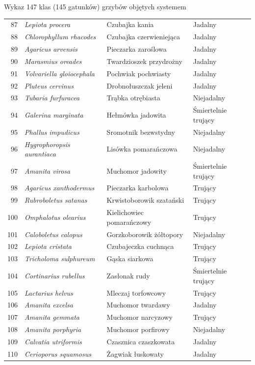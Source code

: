 \begin{easyappendix}{Wykaz 147 klas (145 gatunków) grzybów objętych systemem}
\begin{longtable}{|r|l|l|l|}
87 & \textit{Lepiota procera} & Czubajka kania & Jadalny \\
88 & \textit{Chlorophyllum rhacodes} & Czubajka czerwieniejąca & Jadalny \\
89 & \textit{Agaricus arvensis} & Pieczarka zaroślowa & Jadalny \\
90 & \textit{Marasmius oreades} & Twardzioszek przydrożny & Jadalny \\
91 & \textit{Volvariella gloiocephala} & Pochwiak pochwiasty & Jadalny \\
92 & \textit{Pluteus cervinus} & Drobnołuszczak jeleni & Jadalny \\
93 & \textit{Tubaria furfuracea} & Trąbka otrębiasta & Niejadalny \\
94 & \textit{Galerina marginata} & Hełmówka jadowita & Śmiertelnie trujący \\
95 & \textit{Phallus impudicus} & Sromotnik bezwstydny & Niejadalny \\
96 & \textit{Hygrophoropsis aurantiaca} & Lisówka pomarańczowa & Niejadalny \\
97 & \textit{Amanita virosa} & Muchomor jadowity & Śmiertelnie trujący \\
98 & \textit{Agaricus xanthodermus} & Pieczarka karbolowa & Trujący \\
99 & \textit{Rubroboletus satanas} & Krwistoborowik szatański & Trujący \\
100 & \textit{Omphalotus olearius} & Kielichowiec pomarańczowy & Trujący \\
101 & \textit{Caloboletus calopus} & Gorzkoborowik żółtopory & Niejadalny \\
102 & \textit{Lepiota cristata} & Czubajeczka cuchnąca & Trujący \\
103 & \textit{Tricholoma sulphureum} & Gąska siarkowa & Trujący \\
104 & \textit{Cortinarius rubellus} & Zasłonak rudy & Śmiertelnie trujący \\
105 & \textit{Lactarius helvus} & Mleczaj torfowcowy & Trujący \\
106 & \textit{Amanita excelsa} & Muchomor twardawy & Jadalny \\
107 & \textit{Amanita gemmata} & Muchomor narcyzowy & Trujący \\
108 & \textit{Amanita porphyria} & Muchomor porfirowy & Niejadalny \\
109 & \textit{Calvatia utriformis} & Czasznica czaszkowata & Jadalny \\
110 & \textit{Cerioporus squamosus} & Żagwiak łuskowaty & Jadalny \\

\end{longtable}
\end{easyappendix}
